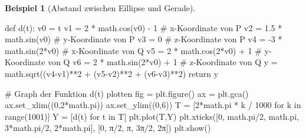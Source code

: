 \documentclass[
  letterpaper,
  DIV=11,
  oneside]{scrreprt}
\newenvironment{Shaded}{\begin{snugshade}}{\end{snugshade}}
\newcommand{\BuiltInTok}[1]{\textcolor[rgb]{0.00,0.23,0.31}{#1}}
\newcommand{\CommentTok}[1]{\textcolor[rgb]{0.37,0.37,0.37}{#1}}
\newcommand{\ControlFlowTok}[1]{\textcolor[rgb]{0.00,0.23,0.31}{#1}}
\newcommand{\DecValTok}[1]{\textcolor[rgb]{0.68,0.00,0.00}{#1}}
\newcommand{\FloatTok}[1]{\textcolor[rgb]{0.68,0.00,0.00}{#1}}
\newcommand{\KeywordTok}[1]{\textcolor[rgb]{0.00,0.23,0.31}{#1}}
\newcommand{\NormalTok}[1]{\textcolor[rgb]{0.00,0.23,0.31}{#1}}
\newcommand{\OperatorTok}[1]{\textcolor[rgb]{0.37,0.37,0.37}{#1}}
\newcommand{\StringTok}[1]{\textcolor[rgb]{0.13,0.47,0.30}{#1}}
\theoremstyle{definition}
\theoremstyle{definition}
\newtheorem{example}{Beispiel}[chapter]
\theoremstyle{remark}
\begin{document}
\begin{example}[Abstand zwischen Eillipse und
Gerade]
\begin{Shaded}
\begin{Highlighting}[]
\KeywordTok{def}\NormalTok{ d(t):}
\NormalTok{    v0 }\OperatorTok{=}\NormalTok{ t}
\NormalTok{    v1 }\OperatorTok{=} \DecValTok{2} \OperatorTok{*}\NormalTok{ math.cos(v0) }\OperatorTok{{-}} \DecValTok{1}    \CommentTok{\# x{-}Koordinate von P}
\NormalTok{    v2 }\OperatorTok{=} \FloatTok{1.5} \OperatorTok{*}\NormalTok{ math.sin(v0)      }\CommentTok{\# y{-}Koordinate von P}
\NormalTok{    v3 }\OperatorTok{=} \DecValTok{0}                       \CommentTok{\# z{-}Koordinate von P}
\NormalTok{    v4 }\OperatorTok{=} \OperatorTok{{-}}\DecValTok{3} \OperatorTok{*}\NormalTok{ math.sin(}\DecValTok{2}\OperatorTok{*}\NormalTok{v0)     }\CommentTok{\# x{-}Koordinate von Q}
\NormalTok{    v5 }\OperatorTok{=} \DecValTok{2} \OperatorTok{*}\NormalTok{ math.cos(}\DecValTok{2}\OperatorTok{*}\NormalTok{v0) }\OperatorTok{+} \DecValTok{1}  \CommentTok{\# y{-}Koordinate von Q}
\NormalTok{    v6 }\OperatorTok{=} \DecValTok{2} \OperatorTok{*}\NormalTok{ math.sin(}\DecValTok{2}\OperatorTok{*}\NormalTok{v0) }\OperatorTok{+} \DecValTok{1}  \CommentTok{\# z{-}Koordinate von Q}
\NormalTok{    y }\OperatorTok{=}\NormalTok{ math.sqrt((v4}\OperatorTok{{-}}\NormalTok{v1)}\OperatorTok{**}\DecValTok{2} \OperatorTok{+}\NormalTok{ (v5}\OperatorTok{{-}}\NormalTok{v2)}\OperatorTok{**}\DecValTok{2} \OperatorTok{+}\NormalTok{ (v6}\OperatorTok{{-}}\NormalTok{v3)}\OperatorTok{**}\DecValTok{2}\NormalTok{)}
    \ControlFlowTok{return}\NormalTok{ y}

\CommentTok{\# Graph der Funktion d(t) plotten}
\NormalTok{fig }\OperatorTok{=}\NormalTok{ plt.figure()}
\NormalTok{ax }\OperatorTok{=}\NormalTok{ plt.gca()}
\NormalTok{ax.set\_xlim((}\DecValTok{0}\NormalTok{,}\DecValTok{2}\OperatorTok{*}\NormalTok{math.pi))}
\NormalTok{ax.set\_ylim((}\DecValTok{0}\NormalTok{,}\DecValTok{6}\NormalTok{))}
\NormalTok{T }\OperatorTok{=}\NormalTok{ [}\DecValTok{2}\OperatorTok{*}\NormalTok{math.pi }\OperatorTok{*}\NormalTok{ k }\OperatorTok{/} \DecValTok{1000} \ControlFlowTok{for}\NormalTok{ k }\KeywordTok{in} \BuiltInTok{range}\NormalTok{(}\DecValTok{1001}\NormalTok{)]}
\NormalTok{Y }\OperatorTok{=}\NormalTok{ [d(t) }\ControlFlowTok{for}\NormalTok{ t }\KeywordTok{in}\NormalTok{ T]}
\NormalTok{plt.plot(T,Y)}
\NormalTok{plt.xticks([}\DecValTok{0}\NormalTok{, math.pi}\OperatorTok{/}\DecValTok{2}\NormalTok{, math.pi, }\DecValTok{3}\OperatorTok{*}\NormalTok{math.pi}\OperatorTok{/}\DecValTok{2}\NormalTok{, }\DecValTok{2}\OperatorTok{*}\NormalTok{math.pi],}
\NormalTok{           [}\StringTok{\textquotesingle{}0\textquotesingle{}}\NormalTok{, }\StringTok{\textquotesingle{}π/2\textquotesingle{}}\NormalTok{, }\StringTok{\textquotesingle{}π\textquotesingle{}}\NormalTok{, }\StringTok{\textquotesingle{}3π/2\textquotesingle{}}\NormalTok{, }\StringTok{\textquotesingle{}2π\textquotesingle{}}\NormalTok{])}
\NormalTok{plt.show()  }
\end{Highlighting}
\end{Shaded}


\end{example}
\end{document}

